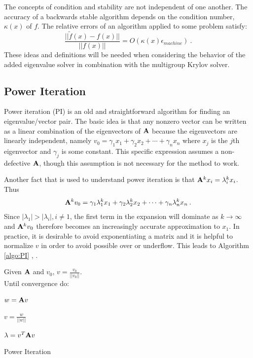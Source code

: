 The concepts of condition and stability are not independent of one another. The accuracy of a backwards stable algorithm depends on the condition number, $\kappa(x)$ of $f$. The relative errors of an algorithm applied to some problem satisfy:
%
\begin{equation}
  \frac{||\tilde{f}(x) - f(x)||}{||f(x)||} = O(\kappa(x) \epsilon _{machine}) \:.
\end{equation}
These ideas and definitions will be needed when considering the behavior of the added eigenvalue solver in combination with the multigroup Krylov solver. 

\subsection{Power Iteration}
Power iteration (PI) is an old and straightforward algorithm for finding an eigenvalue/vector pair. The basic idea is that any nonzero vector can be written as a linear combination of the eigenvectors of $\mathbf{A}$ because the eigenvectors are linearly independent, namely $v_0 = \gamma_1 x_1 + \gamma_2 x_2 + \cdots + \gamma_n x_n$ where $x_{j}$ is the $j$th eigenvector and $\gamma_{j}$ is some constant. This specific expression assumes a non-defective $\mathbf{A}$, though this assumption is not necessary for the method to work. 

Another fact that is used to understand power iteration is that $\mathbf{A}^k x_i = \lambda_i^k x_i$. Thus
%
\begin{equation}
  \mathbf{A}^k v_{0} = \gamma_1 \lambda_1^k x_1 + \gamma_2 \lambda_2^k x_2 + \cdots + \gamma_n \lambda_n^k x_n \:.
  \label{eq:Ak}
\end{equation}
%
Since $|\lambda_1| > |\lambda_i|, i \ne 1$, the first term in the expansion will dominate as $k \to \infty$ and $\mathbf{A}^k v_{0}$ therefore becomes an increasingly accurate approximation to $x_1$. In practice, it is desirable to avoid exponentiating a matrix and it is helpful to normalize $v$ in order to avoid possible over or underflow. This leads to Algorithm \ref{algo:PI} \cite{Stewart2001}, \cite{Trefethen1997}. 
%
\begin{algorithm}
  Given $\mathbf{A}$ and $v_0$, $v = \frac{v_{0}}{||v_{0}||}$. \\
  Until convergence do:
  \begin{list}{}{\hspace{2em}}
    \item $w = \mathbf{A}v$
    \item $v = \frac{w}{||w||}$
    \item $\lambda = v^{T}\mathbf{A}v$
  \end{list}
  \caption{Power Iteration}
  \label{algo:PI}
\end{algorithm}

